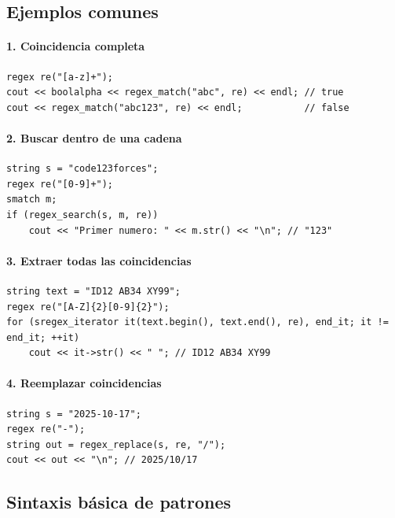 \documentclass{article}
\begin{document}
\subsection{Ejemplos comunes}

\paragraph{1. Coincidencia completa}
\begin{lstlisting}[style=cppstyle]
regex re("[a-z]+");
cout << boolalpha << regex_match("abc", re) << endl; // true
cout << regex_match("abc123", re) << endl;           // false
\end{lstlisting}

\paragraph{2. Buscar dentro de una cadena}
\begin{lstlisting}[style=cppstyle]
string s = "code123forces";
regex re("[0-9]+");
smatch m;
if (regex_search(s, m, re))
    cout << "Primer numero: " << m.str() << "\n"; // "123"
\end{lstlisting}

\paragraph{3. Extraer todas las coincidencias}
\begin{lstlisting}[style=cppstyle]
string text = "ID12 AB34 XY99";
regex re("[A-Z]{2}[0-9]{2}");
for (sregex_iterator it(text.begin(), text.end(), re), end_it; it != end_it; ++it)
    cout << it->str() << " "; // ID12 AB34 XY99
\end{lstlisting}

\paragraph{4. Reemplazar coincidencias}
\begin{lstlisting}[style=cppstyle]
string s = "2025-10-17";
regex re("-"); 
string out = regex_replace(s, re, "/");
cout << out << "\n"; // 2025/10/17
\end{lstlisting}

\subsection{Sintaxis básica de patrones}
\end{document}

